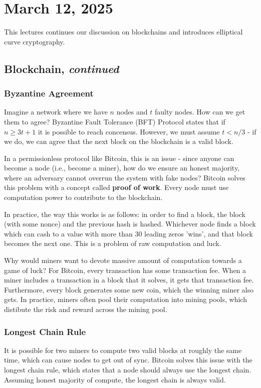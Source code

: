 \section{March 12, 2025}
\label{20260312}

This lectures continues our discussion on blockchains and introduces elliptical curve cryptography.

\subsection{Blockchain, \emph{continued}}

\subsubsection{Byzantine Agreement}

Imagine a network where we have $n$ nodes and $t$ faulty nodes. How can we get them to agree? Byzantine Fault Tolerance (BFT) Protocol states that if $n \ge 3t + 1$ it is possible to reach concensus. However, we must assume $t < n/3$ - if we do, we can agree that the next block on the blockchain is a valid block. 

In a permissionless protocol like Bitcoin, this is an issue - since anyone can become a node (i.e., become a miner), how do we ensure an honest majority, where an adversary cannot overrun the system with fake nodes? Bitcoin solves this problem with a concept called \textbf{proof of work}. Every node must use computation power to contribute to the blockchain.

In practice, the way this works is as follows: in order to find a block, the block (with some nonce) and the previous hash is hashed. Whichever node finds a block which can cash to a value with more than 30 leading zeros 'wins', and that block becomes the next one. This is a problem of raw computation and luck.

Why would miners want to devote massive amount of computation towards a game of luck? For Bitcoin, every transaction has some transaction fee. When a miner includes a transaction in a block that it solves, it gets that transaction fee. Furthermore, every block generates some new coin, which the winning miner also gets. In practice, miners often pool their computation into mining pools, which distibute the risk and reward across the mining pool.


\subsubsection{Longest Chain Rule}
It is possible for two miners to compute two valid blocks at roughly the same time, which can cause nodes to get out of sync. Bitcoin solves this issue with the longest chain rule, which states that a node should always use the longest chain. Assuming honest majority of compute, the longest chain is always valid.

